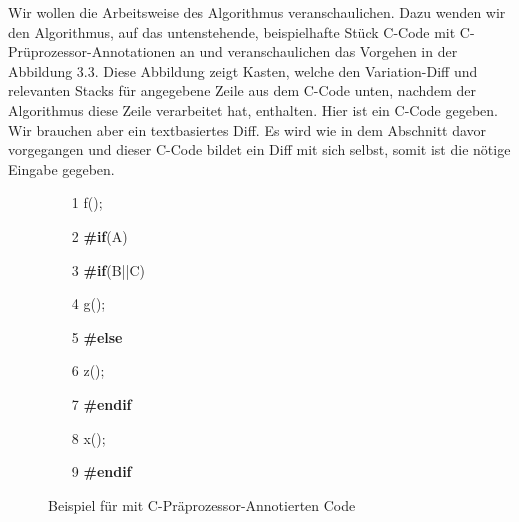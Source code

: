 Wir wollen die Arbeitsweise des Algorithmus veranschaulichen. Dazu wenden wir den Algorithmus, auf das untenstehende, beispielhafte Stück C-Code mit C-Prüprozessor-Annotationen an und veranschaulichen das Vorgehen in der Abbildung 3.3. Diese Abbildung zeigt Kasten, welche den Variation-Diff und relevanten Stacks für angegebene Zeile aus dem C-Code unten, nachdem  der Algorithmus diese Zeile verarbeitet hat, enthalten. Hier ist ein C-Code gegeben. Wir brauchen aber ein textbasiertes Diff. Es wird wie in dem Abschnitt davor vorgegangen und dieser C-Code bildet ein Diff mit sich selbst, somit ist die nötige Eingabe gegeben.
\begin{figure}[h]
	\begin{itemize}
		\item[1 ] f();
		\item[2 ] \textbf{\#if}(A)
		\item[3 ] \hspace*{0.5cm} \textbf{\#if}(B||C)
		\item[4 ] \hspace*{1cm}g();
		\item[5 ] \hspace*{0.5cm}\textbf{\#else}
		\item[6 ] \hspace*{1cm}z();
		\item[7 ] \hspace*{0.5cm}\textbf{\#endif}
		\item[8 ] \hspace*{0.5cm}x();
		\item[9 ] \textbf{\#endif}
	\end{itemize}
	\caption{Beispiel für mit C-Präprozessor-Annotierten Code}
\end{figure}
